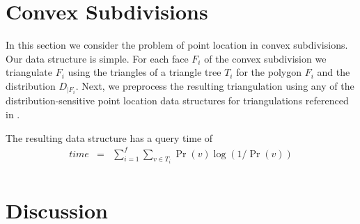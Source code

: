 \documentclass[charterfonts,lotsofwhite]{patmorin}
\begin{document}
\section{Convex Subdivisions}

In this section we consider the problem of point location in convex
subdivisions. Our data structure is simple.  For each face $F_i$ of
the convex subdivision we triangulate $F_i$ using the triangles of a
triangle tree $T_i$ for the polygon $F_i$ and the distribution
$D_{|F_i}$.  Next, we preprocess the resulting triangulation using any
of the distribution-sensitive point location data structures for
triangulations referenced in .

The resulting data structure has a query time of 
\begin{eqnarray*}
time & = & \sum_{i=1}^f 
	\sum_{v\in T_i} \Pr(v)\log(1/\Pr(v)) \\
\end{eqnarray*}


\section{Discussion}
\end{document}
